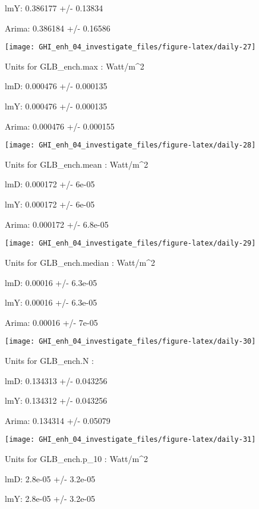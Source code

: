 \documentclass[
  10pt,
  a4paper,oneside]{article}
\begin{document}
lmY: 0.386177 +/- 0.13834

Arima: 0.386184 +/- 0.16586

\begin{center}\texttt{[image: GHI\_enh\_04\_investigate\_files/figure-latex/daily-27]} \end{center}

Units for GLB\_ench.max : Watt/m\^{}2

lmD: 0.000476 +/- 0.000135

lmY: 0.000476 +/- 0.000135

Arima: 0.000476 +/- 0.000155

\begin{center}\texttt{[image: GHI\_enh\_04\_investigate\_files/figure-latex/daily-28]} \end{center}

Units for GLB\_ench.mean : Watt/m\^{}2

lmD: 0.000172 +/- 6e-05

lmY: 0.000172 +/- 6e-05

Arima: 0.000172 +/- 6.8e-05

\begin{center}\texttt{[image: GHI\_enh\_04\_investigate\_files/figure-latex/daily-29]} \end{center}

Units for GLB\_ench.median : Watt/m\^{}2

lmD: 0.00016 +/- 6.3e-05

lmY: 0.00016 +/- 6.3e-05

Arima: 0.00016 +/- 7e-05

\begin{center}\texttt{[image: GHI\_enh\_04\_investigate\_files/figure-latex/daily-30]} \end{center}

Units for GLB\_ench.N :

lmD: 0.134313 +/- 0.043256

lmY: 0.134312 +/- 0.043256

Arima: 0.134314 +/- 0.05079

\begin{center}\texttt{[image: GHI\_enh\_04\_investigate\_files/figure-latex/daily-31]} \end{center}

Units for GLB\_ench.p\_10 : Watt/m\^{}2

lmD: 2.8e-05 +/- 3.2e-05

lmY: 2.8e-05 +/- 3.2e-05
\end{document}
